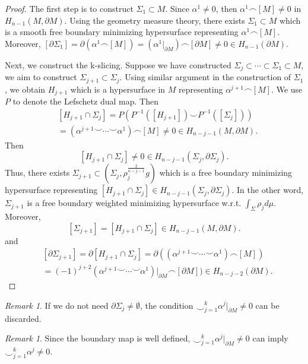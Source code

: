 \documentclass[11pt,letterpaper]{amsart}
\theoremstyle{definition}
\theoremstyle{remark}
\newtheorem{remark}[theorem]{Remark}
\numberwithin{equation}{section}
\begin{document}
\begin{proof}
    The first step is to construct $\Sigma_{1}\subset M$. Since $\alpha^{1}\neq 0$, then $\alpha^{1}\frown [M]\neq 0$ in $H_{n-1}(M,\partial M)$. Using the geometry measure theory, there exists $\Sigma_{1}\subset M$ which is a smooth free boundary minimizing hypersurface representing $\alpha^{1}\frown [M]$. Moreover, $[\partial \Sigma_{1}] =\partial (\alpha^{1}\frown [M]) = (\alpha^{1}|_{\partial M})\frown [\partial M]\neq 0\in H_{n-1}(\partial M) $.

    Next, we construct the k-slicing. Suppose we have constructed $\Sigma_{j}\subset \cdots\subset \Sigma_{1}\subset M$, we aim to construct $\Sigma_{j+1}\subset \Sigma_j$. Using similar argument in the construction of $\Sigma_{1}$, we obtain $H_{j+1}$ which is a hypersurface in $M$ representing $\alpha^{j+1}\frown [M]$. We use $P$ to denote the Lefschetz dual map. Then 
    \[
    \begin{aligned}
    &[H_{j+1}\cap \Sigma_{j}] = P(P^{-1}([H_{j+1}])\smile P^{-1}([\Sigma_{j}]))\\
    &= (\alpha^{j+1}\smile\cdots\smile\alpha^{1})\frown [M]\neq 0\in H_{n-j-1}(M,\partial M).
    \end{aligned}
    \]
    Then
    \[
    [H_{j+1}\cap \Sigma_{j}]\neq 0 \in H_{n-j-1}(\Sigma_{j},\partial \Sigma_{j}).
    \]
    Thus, there exists $\Sigma_{j+1}\subset (\Sigma_{j},\rho_{j}^{\frac{2}{n-j-1}}g)$ which is a free boundary minimizing hypersurface representing $[H_{j+1}\cap \Sigma_{j}]\in H_{n-j-1}(\Sigma_{j},\partial \Sigma_{j})$. In the other word, $\Sigma_{j+1}$ is a free boundary weighted minimizing hypersurface w.r.t. $\int_{\Sigma}\rho_{j}d\mu$. Moreover,
    \[
    [\Sigma_{j+1}]= [H_{j+1}\cap \Sigma_{j}]\in H_{n-j-1}(M,\partial M).
    \]
    and
    \[
    \begin{aligned}
    &[\partial \Sigma_{j+1}]= \partial [H_{j+1}\cap \Sigma_{j}]= \partial ((\alpha^{j+1}\smile\cdots\smile\alpha^{1})\frown [M])\\
    &=(-1)^{j+2}(\alpha^{j+1}\smile\cdots\smile\alpha^{1})|_{\partial M}\frown [\partial M])\in H_{n-j-2}(\partial M).
    \end{aligned}
    \]
\end{proof}
\begin{remark}\label{without boundary condition}
    If we do not need $\partial \Sigma_{j}\neq \emptyset$, the condition $\smile_{j=1}^{k}\alpha^{j}|_{\partial M}\neq 0$ can be discarded.
\end{remark}
\begin{remark}
    Since the boundary map is well defined, $\smile_{j=1}^{k}\alpha^{j}|_{\partial M}\neq 0$ can imply $\smile_{j=1}^{k}\alpha^{j}\neq 0$.
\end{remark}
\end{document}
